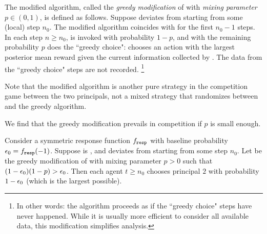 The modified algorithm, called the \emph{greedy modification} of \alg  with \emph{mixing parameter} $p\in (0,1)$, is defined as follows. Suppose \alg deviates from \DynGreedy starting from some (local) step $n_0$.
The modified algorithm coincides with \DynGreedy
for the first $n_0-1$ steps.
In each step $n\geq n_0$, \alg is invoked with probability
  $1-p$, and with the remaining probability $p$ does the ``greedy
  choice": chooses an action with the largest posterior mean reward
  given the current information collected by \alg.
The data from the ``greedy choice" steps are not recorded.%
\footnote{In other words: the algorithm proceeds as if the ``greedy choice" steps have never happened.  While it is usually more efficient to consider all available data, this modification simplifies analysis.}



Note that the modified algorithm is another pure strategy in the competition game between the two principals, not a mixed strategy that randomizes between \alg and the greedy algorithm.

We find that the greedy modification prevails in competition if $p$ is small enough.

\begin{theorem}\label{thm:random-greedy}
Consider a symmetric \HardMaxRandom response function $f_{\mathtt{resp}}$ with baseline probability $\epsilon_0 = f_{\mathtt{resp}}(-1)$. Suppose \alg[1] is \bmonotone, and deviates from \DynGreedy starting from some step $n_0$. Let \alg[2] be the greedy modification of \alg[1] with mixing parameter $p>0$ such that
    $(1-\epsilon_0)(1-p)>\epsilon_0$.
Then each agent $t\geq n_0$ chooses principal $2$ with probability $1-\epsilon_0$ (which is the largest possible).
\end{theorem}

